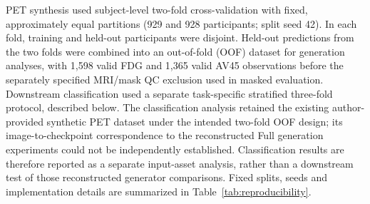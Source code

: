 PET synthesis used subject-level two-fold cross-validation with fixed, approximately equal partitions (929 and 928 participants; split seed 42). In each fold, training and held-out participants were disjoint. Held-out predictions from the two folds were combined into an out-of-fold (OOF) dataset for generation analyses, with 1,598 valid FDG and 1,365 valid AV45 observations before the separately specified MRI/mask QC exclusion used in masked evaluation. Downstream classification used a separate task-specific stratified three-fold protocol, described below. The classification analysis retained the existing author-provided synthetic PET dataset under the intended two-fold OOF design; its image-to-checkpoint correspondence to the reconstructed Full generation experiments could not be independently established. Classification results are therefore reported as a separate input-asset analysis, rather than a downstream test of those reconstructed generator comparisons. Fixed splits, seeds and implementation details are summarized in Table~\ref{tab:reproducibility}.
